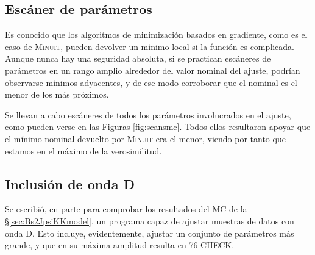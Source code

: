 
\subsection{Escáner de parámetros}

Es conocido que los algoritmos de minimización basados en gradiente, como es el caso de \textsc{Minuit}, pueden devolver un mínimo local si la función es complicada. Aunque nunca hay una seguridad absoluta, si se practican escáneres de parámetros en un rango amplio alrededor del valor nominal del ajuste, podrían observarse mínimos adyacentes, y de ese modo corroborar que el nominal es el menor de los más próximos.

Se llevan a cabo escáneres de todos los parámetros involucrados en el ajuste, como pueden verse en las Figuras \ref{fig:scansmc}. Todos ellos resultaron apoyar que el mínimo nominal devuelto por \textsc{Minuit} era el menor, viendo por tanto que estamos en el máximo de la verosimilitud.

\subsection{Inclusión de onda D}

Se escribió, en parte para comprobar los resultados del MC de la \S \ref{sec:Bs2JpsiKKmodel}, un programa capaz de ajustar muestras de datos con onda D. Esto incluye, evidentemente, ajustar un conjunto de parámetros más grande, y que en su máxima amplitud resulta en 76 CHECK.

